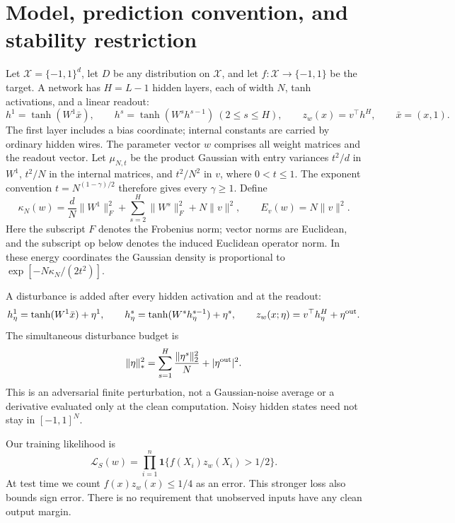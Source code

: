 \section{Model, prediction convention, and stability restriction}
\label{sec:theory-model}

Let $\mathcal X=\{-1,1\}^d$, let $D$ be any distribution on $\mathcal X$,
and let $f:\mathcal X\to\{-1,1\}$ be the target. A network has $H=L-1$
hidden layers, each of width $N$, tanh activations, and a linear readout:
\[
 h^1=\tanh(W^1\bar x),\qquad
 h^s=\tanh(W^s h^{s-1})\ (2\le s\le H),\qquad
 z_w(x)=v^\top h^H,
 \qquad \bar x=(x,1).
\]
The first layer includes a bias coordinate; internal constants are carried
by ordinary hidden wires. The parameter vector $w$ comprises all weight
matrices and the readout vector. Let $\mu_{N,t}$ be the product Gaussian
with entry
variances $t^2/d$ in $W^1$, $t^2/N$ in the internal matrices, and $t^2/N^2$
in $v$, where $0<t\le1$. The exponent convention
$t=N^{(1-\gamma)/2}$ therefore gives every $\gamma\ge1$. Define
\[
 \kappa_N(w)=\frac dN\|W^1\|_F^2+
           \sum_{s=2}^H\|W^s\|_F^2+N\|v\|^2,
 \qquad E_v(w)=N\|v\|^2.
\]
Here the subscript $F$ denotes the Frobenius norm; vector norms are
Euclidean, and the subscript $\mathrm{op}$ below denotes the induced
Euclidean operator norm. In these energy coordinates the Gaussian density
is proportional to
$\exp[-N\kappa_N/(2t^2)]$.

A disturbance is added after every hidden activation and at the readout:
\[
 h^1_\eta=\tanh(W^1\bar x)+\eta^1,\qquad
 h^s_\eta=\tanh(W^s h^{s-1}_\eta)+\eta^s,\qquad
 z_w(x;\eta)=v^\top h^H_\eta+\eta^{\rm out}.
\]
The simultaneous disturbance budget is
\begin{equation}\label{eq:standalone-noise}
 \|\eta\|_*^2=\sum_{s=1}^H\frac{\|\eta^s\|_2^2}{N}
                       +|\eta^{\rm out}|^2.
\end{equation}
This is an adversarial finite perturbation, not a Gaussian-noise average or
a derivative evaluated only at the clean computation. Noisy hidden states
need not stay in $[-1,1]^N$.

Our training likelihood is
\begin{equation}\label{eq:standalone-likelihood}
 \mathcal L_S(w)=\prod_{i=1}^n
       \mathbf1\{f(X_i)z_w(X_i)>1/2\}.
\end{equation}
At test time we count $f(x)z_w(x)\le1/4$ as an error. This stronger loss
also bounds sign error. There is no requirement that unobserved inputs have
any clean output margin.

